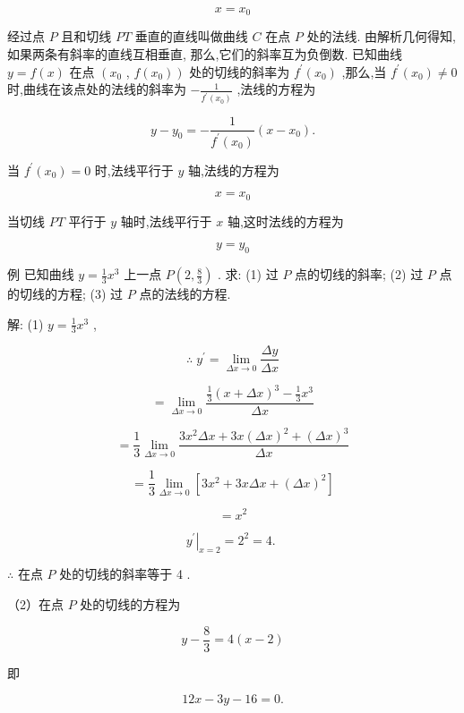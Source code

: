 \documentclass[10pt]{article}
\begin{document}
\[
x = {x}_{0}
\]

经过点 \(P\) 且和切线 \({PT}\) 垂直的直线叫做曲线 \(C\) 在点 \(P\) 处的法线. 由解析几何得知, 如果两条有斜率的直线互相垂直, 那么,它们的斜率互为负倒数. 已知曲线 \(y = f\left( x\right)\) 在点 \(\left( {x}_{0}\right.\) , \(\left. {f\left( {x}_{0}\right) }\right)\) 处的切线的斜率为 \({f}^{\prime }\left( {x}_{0}\right)\) ,那么,当 \({f}^{\prime }\left( {x}_{0}\right) \neq 0\) 时,曲线在该点处的法线的斜率为 \(- \frac{1}{{f}^{\prime }\left( {x}_{0}\right) }\) ,法线的方程为

\[
y - {y}_{0} = - \frac{1}{{f}^{\prime }\left( {x}_{0}\right) }\left( {x - {x}_{0}}\right) .
\]

当 \({f}^{\prime }\left( {x}_{0}\right) = 0\) 时,法线平行于 \(y\) 轴,法线的方程为

\[
x = {x}_{0}
\]

当切线 \({PT}\) 平行于 \(y\) 轴时,法线平行于 \(x\) 轴,这时法线的方程为

\[
y = {y}_{0}
\]

例 已知曲线 \(y = \frac{1}{3}{x}^{3}\) 上一点 \(P\left( {2,\frac{8}{3}}\right)\) . 求: (1) 过 \(P\) 点的切线的斜率; (2) 过 \(P\) 点的切线的方程; (3) 过 \(P\) 点的法线的方程.

解: (1) \(y = \frac{1}{3}{x}^{3}\) ,

\[
\therefore \;{y}^{\prime } = \mathop{\lim }\limits_{{{\Delta x} \rightarrow 0}}\frac{\Delta y}{\Delta x}
\]

\[
= \mathop{\lim }\limits_{{{\Delta x} \rightarrow 0}}\frac{\frac{1}{3}{\left( x + \Delta x\right) }^{3} - \frac{1}{3}{x}^{3}}{\Delta x}
\]

\[
= \frac{1}{3}\mathop{\lim }\limits_{{{\Delta x} \rightarrow 0}}\frac{3{x}^{2}{\Delta x} + {3x}{\left( \Delta x\right) }^{2} + {\left( \Delta x\right) }^{3}}{\Delta x}
\]

\[
= \frac{1}{3}\mathop{\lim }\limits_{{{\Delta x} \rightarrow 0}}\left\lbrack {3{x}^{2} + {3x\Delta x} + {\left( \Delta x\right) }^{2}}\right\rbrack
\]

\[
= {x}^{2}
\]

\[
{\left. {y}^{\prime }\right| }_{x = 2} = {2}^{2} = 4\text{. }
\]

\(\therefore\) 在点 \(P\) 处的切线的斜率等于 4 .

（2）在点 \(P\) 处的切线的方程为

\[
y - \frac{8}{3} = 4\left( {x - 2}\right)
\]

即

\[
{12x} - {3y} - {16} = 0.
\]
\end{document}
